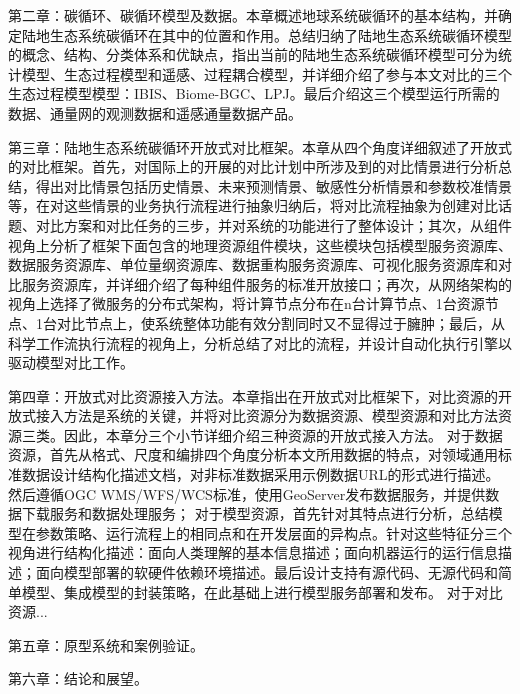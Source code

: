 第二章：碳循环、碳循环模型及数据。本章概述地球系统碳循环的基本结构，并确定陆地生态系统碳循环在其中的位置和作用。总结归纳了陆地生态系统碳循环模型的概念、结构、分类体系和优缺点，指出当前的陆地生态系统碳循环模型可分为统计模型、生态过程模型和遥感、过程耦合模型，并详细介绍了参与本文对比的三个生态过程模型模型：IBIS、Biome-BGC、LPJ。最后介绍这三个模型运行所需的数据、通量网的观测数据和遥感通量数据产品。

第三章：陆地生态系统碳循环开放式对比框架。本章从四个角度详细叙述了开放式的对比框架。首先，对国际上的开展的对比计划中所涉及到的对比情景进行分析总结，得出对比情景包括历史情景、未来预测情景、敏感性分析情景和参数校准情景等，在对这些情景的业务执行流程进行抽象归纳后，将对比流程抽象为创建对比话题、对比方案和对比任务的三步，并对系统的功能进行了整体设计；其次，从组件视角上分析了框架下面包含的地理资源组件模块，这些模块包括模型服务资源库、数据服务资源库、单位量纲资源库、数据重构服务资源库、可视化服务资源库和对比服务资源库，并详细介绍了每种组件服务的标准开放接口；再次，从网络架构的视角上选择了微服务的分布式架构，将计算节点分布在n台计算节点、1台资源节点、1台对比节点上，使系统整体功能有效分割同时又不显得过于臃肿；最后，从科学工作流执行流程的视角上，分析总结了对比的流程，并设计自动化执行引擎以驱动模型对比工作。

第四章：开放式对比资源接入方法。本章指出在开放式对比框架下，对比资源的开放式接入方法是系统的关键，并将对比资源分为数据资源、模型资源和对比方法资源三类。因此，本章分三个小节详细介绍三种资源的开放式接入方法。
对于数据资源，首先从格式、尺度和编排四个角度分析本文所用数据的特点，对领域通用标准数据设计结构化描述文档，对非标准数据采用示例数据URL的形式进行描述。然后遵循OGC WMS/WFS/WCS标准，使用GeoServer发布数据服务，并提供数据下载服务和数据处理服务；
对于模型资源，首先针对其特点进行分析，总结模型在参数策略、运行流程上的相同点和在开发层面的异构点。针对这些特征分三个视角进行结构化描述：面向人类理解的基本信息描述；面向机器运行的运行信息描述；面向模型部署的软硬件依赖环境描述。最后设计支持有源代码、无源代码和简单模型、集成模型的封装策略，在此基础上进行模型服务部署和发布。
对于对比资源...

第五章：原型系统和案例验证。

第六章：结论和展望。